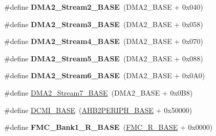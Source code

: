 \begin{DoxyCompactItemize}
\item 
\#define {\bfseries D\+M\+A2\+\_\+\+Stream2\+\_\+\+B\+A\+SE}~(D\+M\+A2\+\_\+\+B\+A\+SE + 0x040)\hypertarget{group___peripheral__memory__map_gaed33a06f08188466f2ede06160984e9a}{}\label{group___peripheral__memory__map_gaed33a06f08188466f2ede06160984e9a}

\item 
\#define {\bfseries D\+M\+A2\+\_\+\+Stream3\+\_\+\+B\+A\+SE}~(D\+M\+A2\+\_\+\+B\+A\+SE + 0x058)\hypertarget{group___peripheral__memory__map_gaf3a9480e08c6ae94f4482e0cdaebdd17}{}\label{group___peripheral__memory__map_gaf3a9480e08c6ae94f4482e0cdaebdd17}

\item 
\#define {\bfseries D\+M\+A2\+\_\+\+Stream4\+\_\+\+B\+A\+SE}~(D\+M\+A2\+\_\+\+B\+A\+SE + 0x070)\hypertarget{group___peripheral__memory__map_gad1e67740e6301233473f64638145dd1f}{}\label{group___peripheral__memory__map_gad1e67740e6301233473f64638145dd1f}

\item 
\#define {\bfseries D\+M\+A2\+\_\+\+Stream5\+\_\+\+B\+A\+SE}~(D\+M\+A2\+\_\+\+B\+A\+SE + 0x088)\hypertarget{group___peripheral__memory__map_gaed1460fdc407b6decfbffccb0260d0af}{}\label{group___peripheral__memory__map_gaed1460fdc407b6decfbffccb0260d0af}

\item 
\#define {\bfseries D\+M\+A2\+\_\+\+Stream6\+\_\+\+B\+A\+SE}~(D\+M\+A2\+\_\+\+B\+A\+SE + 0x0\+A0)\hypertarget{group___peripheral__memory__map_ga5e81174c96fd204fa7c82c815e85c8e6}{}\label{group___peripheral__memory__map_ga5e81174c96fd204fa7c82c815e85c8e6}

\item 
\#define \hyperlink{group___peripheral__memory__map_gaa9faa708ad2440d24eb1064cba9bb06d}{D\+M\+A2\+\_\+\+Stream7\+\_\+\+B\+A\+SE}~(D\+M\+A2\+\_\+\+B\+A\+SE + 0x0\+B8)
\item 
\#define \hyperlink{group___peripheral__memory__map_ga55b794507e021135486de57129a2505c}{D\+C\+M\+I\+\_\+\+B\+A\+SE}~(\hyperlink{group___peripheral__memory__map_gaeedaa71d22a1948492365e2cd26cfd46}{A\+H\+B2\+P\+E\+R\+I\+P\+H\+\_\+\+B\+A\+SE} + 0x50000)
\item 
\#define {\bfseries F\+M\+C\+\_\+\+Bank1\+\_\+\+R\+\_\+\+B\+A\+SE}~(\hyperlink{group___peripheral__memory__map_ga7a599164cd92798542bc6288793d1ed5}{F\+M\+C\+\_\+\+R\+\_\+\+B\+A\+SE} + 0x0000)\hypertarget{group___peripheral__memory__map_ga1d581e6f64ed2e5d97c11c58285a21b6}{}\label{group___peripheral__memory__map_ga1d581e6f64ed2e5d97c11c58285a21b6}


\end{DoxyCompactItemize}
